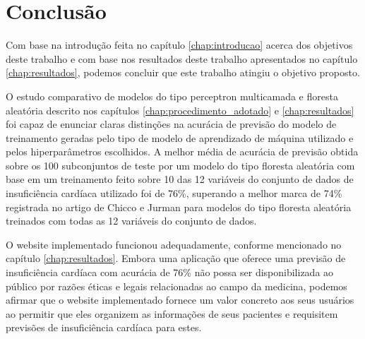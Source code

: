 \chapter{Conclusão} \label{chap:conclusao}

Com base na introdução feita no capítulo \ref{chap:introducao} acerca dos objetivos deste trabalho e com base nos resultados deste trabalho apresentados no capítulo \ref{chap:resultados}, podemos concluir que este trabalho atingiu o objetivo proposto.

O estudo comparativo de modelos do tipo perceptron multicamada e floresta aleatória descrito nos capítulos \ref{chap:procedimento_adotado} e \ref{chap:resultados} foi capaz de enunciar claras distinções na acurácia de previsão do modelo de treinamento geradas pelo tipo de modelo de aprendizado de máquina utilizado e pelos hiperparâmetros escolhidos. A melhor média de acurácia de previsão obtida sobre os 100 subconjuntos de teste por um modelo do tipo floresta aleatória com base em um treinamento feito sobre 10 das 12 variáveis do conjunto de dados de insuficiência cardíaca utilizado\cite{larxel_dataset} foi de 76\%, superando a melhor marca de 74\% registrada no artigo de Chicco e Jurman\cite{chicco2020} para modelos do tipo floresta aleatória treinados com todas as 12 variáveis do conjunto de dados.

O website implementado funcionou adequadamente, conforme mencionado no capítulo \ref{chap:resultados}. Embora uma aplicação que oferece uma previsão de insuficiência cardíaca com acurácia de 76\% não possa ser disponibilizada ao público por razões éticas e legais relacionadas ao campo da medicina, podemos afirmar que o website implementado fornece um valor concreto aos seus usuários ao permitir que eles organizem as informações de seus pacientes e requisitem previsões de insuficiência cardíaca para estes.
